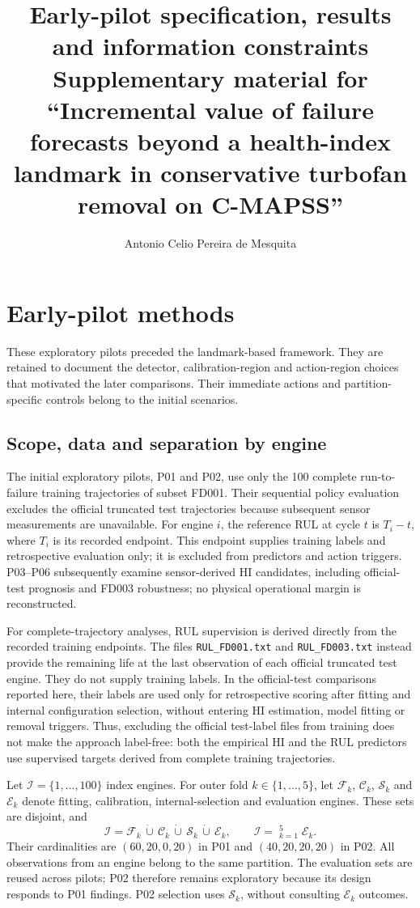 \documentclass[12pt]{article}
\title{Early-pilot specification, results and information constraints\\
\large Supplementary material for ``Incremental value of failure forecasts beyond a health-index landmark in conservative turbofan removal on C-MAPSS''}
\author{Antonio Celio Pereira de Mesquita}
\date{}
\begin{document}
\maketitle

\section{Early-pilot methods}\label{app:early-methods}

These exploratory pilots preceded the landmark-based framework. They are retained to document the detector, calibration-region and action-region choices that motivated the later comparisons. Their immediate actions and partition-specific controls belong to the initial scenarios.

\subsection{Scope, data and separation by engine}

The initial exploratory pilots, P01 and P02, use only the 100 complete run-to-failure training trajectories of subset FD001. Their sequential policy evaluation excludes the official truncated test trajectories because subsequent sensor measurements are unavailable. For engine $i$, the reference RUL at cycle $t$ is $T_i-t$, where $T_i$ is its recorded endpoint. This endpoint supplies training labels and retrospective evaluation only; it is excluded from predictors and action triggers. P03--P06 subsequently examine sensor-derived HI candidates, including official-test prognosis and FD003 robustness; no physical operational margin is reconstructed.

For complete-trajectory analyses, RUL supervision is derived directly from the recorded training endpoints. The files \texttt{RUL\_FD001.txt} and \texttt{RUL\_FD003.txt} instead provide the remaining life at the last observation of each official truncated test engine. They do not supply training labels. In the official-test comparisons reported here, their labels are used only for retrospective scoring after fitting and internal configuration selection, without entering HI estimation, model fitting or removal triggers. Thus, excluding the official test-label files from training does not make the approach label-free: both the empirical HI and the RUL predictors use supervised targets derived from complete training trajectories.

Let $\mathcal I=\{1,\ldots,100\}$ index engines. For outer fold $k\in\{1,\ldots,5\}$, let $\mathcal F_k$, $\mathcal C_k$, $\mathcal S_k$ and $\mathcal E_k$ denote fitting, calibration, internal-selection and evaluation engines. These sets are disjoint, and
\[
\mathcal I=\mathcal F_k\,\dot\cup\,\mathcal C_k\,\dot\cup\,\mathcal S_k\,\dot\cup\,\mathcal E_k,
\qquad \mathcal I=\mathop{\dot\bigcup}_{k=1}^{5}\mathcal E_k.
\]
Their cardinalities are $(60,20,0,20)$ in P01 and $(40,20,20,20)$ in P02. All observations from an engine belong to the same partition. The evaluation sets are reused across pilots; P02 therefore remains exploratory because its design responds to P01 findings. P02 selection uses $\mathcal S_k$, without consulting $\mathcal E_k$ outcomes.
\end{document}

